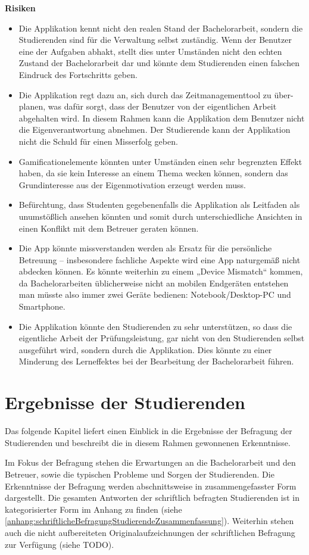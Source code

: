 \documentclass[bibliography=totoc,listof=totoc,BCOR=5mm,DIV=12,oneside]{scrbook}
\begin{document}
\newpage
\par \bigskip \textbf{Risiken}
\begin{itemize}
\item Die Applikation kennt nicht den realen Stand der Bachelorarbeit, sondern die Studierenden sind für die Verwaltung selbst zuständig. Wenn der Benutzer eine der Aufgaben abhakt, stellt dies unter Umständen nicht den echten Zustand der Bachelorarbeit dar und könnte dem Studierenden einen falschen Eindruck des Fortschritts geben.
\item Die Applikation regt dazu an, sich durch das Zeitmanagementtool zu über-planen, was dafür sorgt, dass der Benutzer von der eigentlichen Arbeit abgehalten wird. In diesem Rahmen kann die Applikation dem Benutzer nicht die Eigenverantwortung abnehmen. Der Studierende kann der Applikation nicht die Schuld für einen Misserfolg geben.
\item Gamificationelemente könnten unter Umständen einen sehr begrenzten Effekt haben, da sie kein Interesse an einem Thema wecken können, sondern das Grundinteresse aus der Eigenmotivation erzeugt werden muss.
\item Befürchtung, dass Studenten gegebenenfalls die Applikation als Leitfaden als unumstößlich ansehen könnten und somit durch unterschiedliche Ansichten in einen Konflikt mit dem Betreuer geraten können.
\item Die App könnte missverstanden werden als Ersatz für die persönliche Betreuung – insbesondere fachliche Aspekte wird eine App naturgemäß nicht abdecken können. Es könnte weiterhin zu einem „Device Mismatch“ kommen, da Bachelorarbeiten üblicherweise nicht an mobilen Endgeräten entstehen man müsste also immer zwei Geräte bedienen: Notebook/Desktop-PC und Smartphone.
\item Die Applikation könnte den Studierenden zu sehr unterstützen, so dass die eigentliche Arbeit der Prüfungsleistung, gar nicht von den Studierenden selbst ausgeführt wird, sondern durch die Applikation. Dies könnte zu einer Minderung des Lerneffektes bei der Bearbeitung der Bachelorarbeit führen.

\end{itemize}

\newpage
\section{Ergebnisse der Studierenden}
\par Das folgende Kapitel liefert einen Einblick in die Ergebnisse der Befragung der Studierenden und beschreibt die in diesem Rahmen gewonnenen Erkenntnisse.
\par Im Fokus der Befragung stehen die Erwartungen an die Bachelorarbeit und den Betreuer, sowie die typischen Probleme und Sorgen der Studierenden. Die Erkenntnisse der Befragung werden abschnittsweise in zusammengefasster Form dargestellt. Die gesamten Antworten der schriftlich befragten Studierenden ist in kategorisierter Form im Anhang zu finden (siehe \ref{anhang:schriftlicheBefragungStudierendeZusammenfassung}). Weiterhin stehen auch die nicht aufbereiteten Originalaufzeichnungen der schriftlichen Befragung zur Verfügung (siehe TODO).
\end{document}

